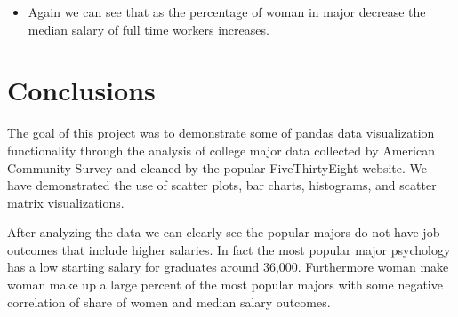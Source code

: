 \documentclass[11pt]{article}
\providecommand{\tightlist}{%
      \setlength{\itemsep}{0pt}\setlength{\parskip}{0pt}}
\begin{document}
    \begin{itemize}
\tightlist
\item
  Again we can see that as the percentage of woman in major decrease the
  median salary of full time workers increases.
\end{itemize}

    \section{Conclusions}\label{conclusions}

    The goal of this project was to demonstrate some of pandas data
visualization functionality through the analysis of college major data
collected by American Community Survey and cleaned by the popular
FiveThirtyEight website. We have demonstrated the use of scatter plots,
bar charts, histograms, and scatter matrix visualizations.

After analyzing the data we can clearly see the popular majors do not
have job outcomes that include higher salaries. In fact the most popular
major psychology has a low starting salary for graduates around 36,000.
Furthermore woman make woman make up a large percent of the most popular
majors with some negative correlation of share of women and median
salary outcomes.


    
    
    
    
\end{document}
